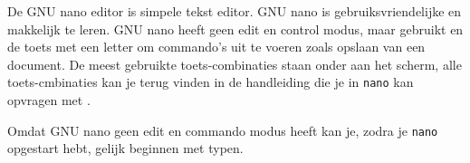 De GNU nano editor is simpele tekst editor. GNU nano is gebruiksvriendelijke en makkelijk te leren. GNU nano heeft geen edit en control modus, maar gebruikt  en de  toets met een letter om commando's uit te voeren zoals opslaan van een document. De meest gebruikte toets-combinaties staan onder aan het scherm, alle toets-cmbinaties kan je terug vinden in de handleiding die je in \texttt{nano} kan opvragen met .

Omdat GNU nano geen edit en commando modus heeft kan je, zodra je \texttt{nano} opgestart hebt, gelijk beginnen met typen.

